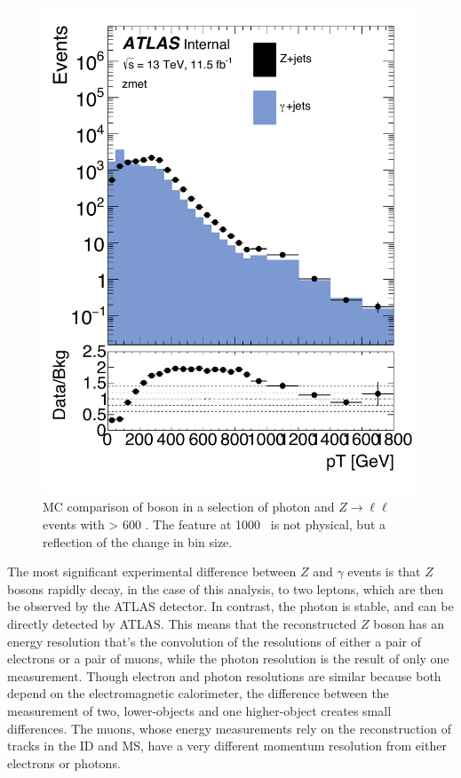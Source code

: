 \begin{centering}
\begin{figure}[!hbt]
\myfloatalign
\includegraphics[width=.85\linewidth]{figures/photons/MC_hist_pt_0_SF_2j_2016_mcmetl___zmet_edit.pdf}
\caption{\ac{MC} comparison of boson \pt in a selection of photon and $Z\rightarrow\ell\ell$ events with \HT > 600 \gev. The feature at 1000 \gev~is not physical, but a reflection of the change in bin size. }
\label{fig:photon_ptdist}
\end{figure}
\end{centering}

The most significant experimental difference between $Z$ and $\gamma$ events is that $Z$ bosons rapidly decay, in the case of this analysis, to two leptons, which are then be observed by the \ac{ATLAS} detector. In contrast, the photon is stable, and can be directly detected by \ac{ATLAS}. This means that the reconstructed $Z$ boson has an energy resolution that's the convolution of the resolutions of either a pair of electrons or a pair of muons, while the photon resolution is the result of only one measurement. Though electron and photon resolutions are similar because both depend on the electromagnetic calorimeter, the difference between the measurement of two, lower-\pt objects and one higher-\pt object creates small differences. The muons, whose energy measurements rely on the reconstruction of tracks in the \ac{ID} and \ac{MS}, have a very different momentum resolution from either electrons or photons. 

